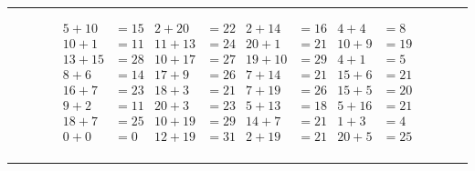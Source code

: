 \documentclass{article}
\begin{document}
\begin{sloppy}
\hrule
\begin{align*}
    {5} + {10} &= {15} & {2} + {20} &= {22} & {2} + {14} &= {16} & {4} + {4} &= {8} \\
    {10} + {1} &= {11} & {11} + {13} &= {24} & {20} + {1} &= {21} & {10} + {9} &= {19} \\
    {13} + {15} &= {28} & {10} + {17} &= {27} & {19} + {10} &= {29} & {4} + {1} &= {5} \\
    {8} + {6} &= {14} & {17} + {9} &= {26} & {7} + {14} &= {21} & {15} + {6} &= {21} \\
    {16} + {7} &= {23} & {18} + {3} &= {21} & {7} + {19} &= {26} & {15} + {5} &= {20} \\
    {9} + {2} &= {11} & {20} + {3} &= {23} & {5} + {13} &= {18} & {5} + {16} &= {21} \\
    {18} + {7} &= {25} & {10} + {19} &= {29} & {14} + {7} &= {21} & {1} + {3} &= {4} \\
    {0} + {0} &= {0} & {12} + {19} &= {31} & {2} + {19} &= {21} & {20} + {5} &= {25} \\
\end{align*}
\hrule
\end{sloppy}
\end{document}
